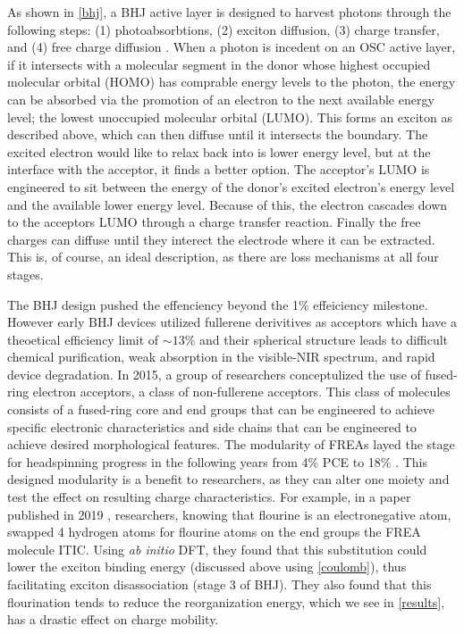 As shown in \ref{bhj}, a BHJ active layer is designed to harvest photons through the following 
steps: (1) photoabsorbtions, 
(2) exciton diffusion, (3) charge transfer, and (4) free charge diffusion \cite{Fusella2019}. 
When a photon is incedent on
an OSC active layer, if it intersects with a molecular segment in the donor whose 
highest occupied molecular orbital (HOMO) has comprable energy levels to the photon, 
the energy can be absorbed via the promotion of
an electron to the next available energy level; the lowest unoccupied molecular orbital (LUMO).
This forms an exciton as
described above, which can then diffuse until it intersects the boundary. 
The excited electron would like to relax
back into is lower energy level, but at the interface with the acceptor, it finds a better option. The
acceptor's LUMO is engineered to sit between the energy of the donor's excited electron's energy level and the
available lower energy level. Because of this, the electron cascades down to the acceptors LUMO through a charge
transfer reaction. Finally the free charges can diffuse until they interect the electrode where it can be
extracted. This is, of course, an ideal description, as there are loss mechanisms at all four stages. 

The BHJ design pushed the effenciency beyond the 1\% effeiciency milestone. However early BHJ devices utilized
fullerene derivitives as acceptors which have a theoetical efficiency limit of $\sim13\%$ \cite{Scharber2016}
and their spherical
structure leads to difficult chemical purification, weak absorption in the visible-NIR spectrum, and rapid
device degradation. In 2015, a group of researchers conceptulized the use of
fused-ring electron acceptors, a class of non-fullerene acceptors. This class of molecules consists of
a fused-ring core and end groups that can be engineered to achieve specific electronic characteristics and side
chains that can be engineered to achieve desired morphological features. The modularity of FREAs
layed the stage for headspinning progress in the following years from 4\% PCE to 18\% \cite{Wang2021a}. 
This designed modularity is a benefit to researchers, as they can alter one moiety and test
the effect on resulting charge characteristics. For example, in a paper published in 2019 \cite{Benatto2019},
researchers, knowing that flourine is an electronegative atom, swapped 4 hydrogen atoms for flourine atoms on
the end groups the FREA molecule ITIC. Using \textit{ab initio} DFT, they found 
that this substitution could lower the exciton
binding energy (discussed above using \autoref{coulomb}), thus facilitating exciton disassociation (stage 3 of
BHJ). They also found
that this flourination tends to reduce the reorganization energy, which we see in \autoref{results}, has a
drastic effect on charge mobility.

